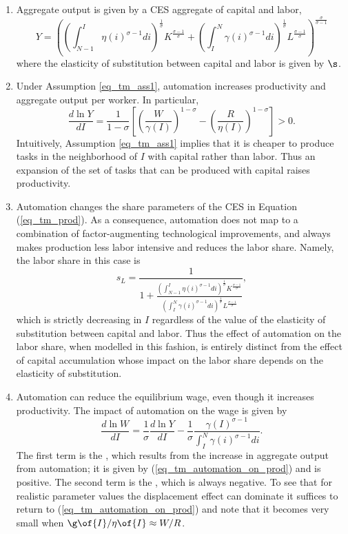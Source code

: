 \documentclass[12pt]{article}
\newcommand{\highlightB}[1]{{\emph{\color{MyBlue}{#1}}}}
\theoremstyle{definition}
\begin{document}
\begin{enumerate}[topsep=0pt, leftmargin=20pt, itemsep=0pt, label=(\arabic*)]
\setlength{\parskip}{10pt} 
\item Aggregate output is given by a CES aggregate of capital and labor, 
\begin{equation}
    \label{eq_tm_prod}
    Y= \left( \left(\int_{N-1}^I \eta(i)^{\sigma-1} d i\right)^{\frac{1}{\sigma}} K^{\frac{\sigma-1}{\sigma}} +\left(\int_I^N \gamma(i)^{\sigma-1} d i\right)^{\frac{1}{\sigma}} L^{\frac{\sigma-1}{\sigma}} \right)^{\frac{\sigma}{\sigma-1}}
\end{equation}
where the elasticity of substitution between capital and labor is given by $\s$.

\item Under Assumption \ref{eq_tm_ass1}, automation increases productivity and aggregate output per worker. In particular, 
\begin{equation}
    \label{eq_tm_automation_on_prod}
    \frac{d \ln Y}{d I}=\frac{1}{1-\sigma}\left[\left(\frac{W}{\gamma(I)}\right)^{1-\sigma}-\left(\frac{R}{\eta(I)}\right)^{1-\sigma}\right]>0 .
\end{equation}
Intuitively, Assumption \ref{eq_tm_ass1} implies that it is cheaper to produce tasks in the neighborhood of $I$ with capital rather than labor. Thus an expansion of the set of tasks that can be produced with capital raises productivity.

\item Automation changes the share parameters of the CES in Equation (\ref{eq_tm_prod}). As a consequence, automation does not map to a combination of factor-augmenting technological improvements, and always makes production less labor intensive and reduces the labor share. Namely, the labor share in this case is 
$$
s_L=\frac{1}{1+\frac{\left(\int_{N-1}^I \eta(i)^{\sigma-1} d i\right)^{\frac{1}{\sigma}} K^{\frac{\sigma-1}{\sigma}}}{\left(\int_I^N \gamma(i)^{\sigma-1} d i\right)^{\frac{1}{\sigma}} L^{\frac{\sigma-1}{\sigma}}}},
$$
which is strictly decreasing in $I$ regardless of the value of the elasticity of substitution between capital and labor. Thus the effect of automation on the labor share, when modelled in this fashion, is entirely distinct from the effect of capital accumulation whose impact on the labor share depends on the elasticity of substitution. 

\item Automation can reduce the equilibrium wage, even though it increases productivity. The impact of automation on the wage is given by
$$
\frac{d \ln W}{d I}=\frac{1}{\sigma} \frac{d \ln Y}{d I}-\frac{1}{\sigma} \frac{\gamma(I)^{\sigma-1}}{\int_I^N \gamma(i)^{\sigma-1} d i}.
$$
The first term is the \highlightB{productivity effect}, which results from the increase in aggregate output from automation; it is given by (\ref{eq_tm_automation_on_prod}) and is positive. The second term is the \highlightB{displacement effect}, which is always negative. To see that for realistic parameter values the displacement effect can dominate it suffices to return to (\ref{eq_tm_automation_on_prod}) and note that it becomes very small when $\g\of{I}/\eta\of{I} \approx W/R$.


\end{enumerate}
\end{document}
